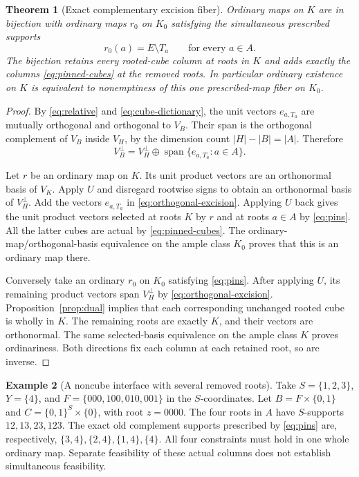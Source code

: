 \documentclass[11pt]{article}
\newtheorem{theorem}{Theorem}[section]
\theoremstyle{definition}
\newtheorem{example}[theorem]{Example}
\begin{document}
\begin{theorem}[Exact complementary excision fiber]\label{thm:excision}
Ordinary maps on $K$ are in bijection with ordinary maps $r_0$ on $K_0$
satisfying the simultaneous prescribed supports
\begin{equation}\label{eq:pins}
 r_0(a)=E\setminus T_a\qquad\text{for every }a\in A.
\end{equation}
The bijection retains every rooted-cube column at roots in $K$ and adds
exactly the columns \eqref{eq:pinned-cubes} at the removed roots.
In particular ordinary existence on $K$ is equivalent to nonemptiness of
this one prescribed-map fiber on $K_0$.
\end{theorem}
\begin{proof}
By \eqref{eq:relative} and \eqref{eq:cube-dictionary}, the unit vectors
$e_{a,T_a}$ are mutually orthogonal and orthogonal to $V_B$. Their span
is the orthogonal complement of $V_B$ inside $V_H$, by the dimension
count $|H|-|B|=|A|$. Therefore
\begin{equation}\label{eq:orthogonal-excision}
 V_B^\perp=V_H^\perp\oplus
                 \operatorname{span}\{e_{a,T_a}:a\in A\}.
\end{equation}

Let $r$ be an ordinary map on $K$. Its unit product vectors are an
orthonormal basis of $V_K$. Apply $U$ and disregard rootwise signs to
obtain an orthonormal basis of $V_H^\perp$. Add the vectors $e_{a,T_a}$
in \eqref{eq:orthogonal-excision}. Applying $U$ back gives the unit
product vectors selected at roots $K$ by $r$ and at roots $a\in A$ by
\eqref{eq:pins}. All the latter cubes are actual by
\eqref{eq:pinned-cubes}. The ordinary-map/orthogonal-basis equivalence
on the ample class $K_0$ proves that this is an ordinary map there.

Conversely take an ordinary $r_0$ on $K_0$ satisfying \eqref{eq:pins}.
After applying $U$, its remaining product vectors span $V_H^\perp$ by
\eqref{eq:orthogonal-excision}. Proposition~\ref{prop:dual} implies that
each corresponding unchanged rooted cube is wholly in $K$. The remaining
roots are exactly $K$, and their vectors are orthonormal. The same
selected-basis equivalence on the ample class $K$ proves ordinariness.
Both directions fix each column at each retained root, so are inverse.
\end{proof}

\begin{example}[A noncube interface with several removed roots]
Take $S=\{1,2,3\}$, $Y=\{4\}$, and
$F=\{000,100,010,001\}$ in the $S$-coordinates. Let
$B=F\times\{0,1\}$ and $C=\{0,1\}^S\times\{0\}$, with root $z=0000$.
The four roots in $A$ have $S$-supports $12,13,23,123$. The exact old
complement supports prescribed by \eqref{eq:pins} are, respectively,
$\{3,4\},\{2,4\},\{1,4\},\{4\}$. All four constraints must hold in
one whole ordinary map. Separate feasibility of these actual columns
does not establish simultaneous feasibility.
\end{example}
\end{document}
